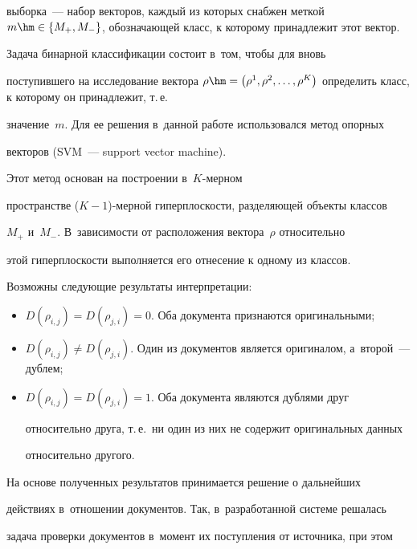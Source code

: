   выборка~--- набор векторов, каждый из которых снабжен меткой $m\hm\in

\{M_+, M_-\}$, обозначающей класс, к которому принадлежит этот вектор.



  Задача бинарной классификации состоит в~том, чтобы для вновь

поступившего на исследование вектора $\rho\hm= \left( \rho^1, \rho^2,\ldots ,

\rho^K\right)$ определить класс, к которому он принадлежит, т.\,е.\

значение~$m$. Для ее решения в~данной работе использовался метод опорных

векторов (SVM~--- support vector machine).

Этот метод основан на построении в~$K$-мер\-ном

пространстве ($K-1$)-мер\-ной гипер\-плос\-кости, разделяющей объекты классов

$M_+$ и~$M_-$. В~зависимости от расположения вектора~$\rho$ относительно

этой гиперплоскости выполняется его отнесение к одному из классов.



  Возможны следующие результаты интерпретации:

  \begin{itemize}

\item $D(\rho_{i,j})=D(\rho_{j,i})=0$. Оба документа признаются оригинальными;

\item $D(\rho_{i,j})\not= D(\rho_{j,i})$. Один из документов является оригиналом, а~второй~--- дублем;

\item $D(\rho_{i,j})=D(\rho_{j,i})=1$. Оба документа являются дублями друг

относительно друга, т.\,е.\ ни один из них не содержит оригинальных данных

относительно другого.

\end{itemize}



  На основе полученных результатов принимается решение о дальнейших

действиях в~отношении документов. Так, в~разработанной системе решалась

задача проверки документов в~момент их поступления от источника, при этом

